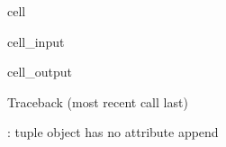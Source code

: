 \documentclass[letterpaper,10pt,english]{jupyterBook}
\begin{document}
\begin{sphinxuseclass}{cell}\begin{sphinxVerbatimInput}

\begin{sphinxuseclass}{cell_input}
\begin{sphinxVerbatim}[commandchars=\\\{\}]
\end{sphinxVerbatim}

\end{sphinxuseclass}\end{sphinxVerbatimInput}
\begin{sphinxVerbatimOutput}

\begin{sphinxuseclass}{cell_output}
\begin{sphinxVerbatim}[commandchars=\\\{\}]
Traceback (most recent call last)
 \PYG{p}{[}\PYG{p}{]}  
 

: \PYGZsq{}tuple\PYGZsq{} object has no attribute \PYGZsq{}append\PYGZsq{}
\end{sphinxVerbatim}

\end{sphinxuseclass}\end{sphinxVerbatimOutput}

\end{sphinxuseclass}
\end{document}
